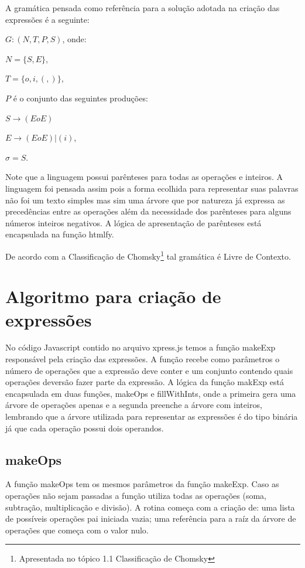 	A gramática pensada como referência para a solução adotada na criação das expressões é a seguinte:
	
$G: (N, T, P, S)$, onde:

$N = \{S,E\}$,

$T = \{o,i,(,)\}$,

$P$ é o conjunto das seguintes produções:

$S \to (EoE)$

$E \to (EoE) | (i)$,

$\sigma = S$.

Note que a linguagem possui parênteses para todas as operações e inteiros. A linguagem foi pensada assim pois a forma ecolhida para representar suas palavras não foi um texto simples mas sim uma árvore que por natureza já expressa as precedências entre as operações além da necessidade dos parênteses para alguns números inteiros negativos. A lógica de apresentação de parênteses está encapsulada na função htmlfy.

	De acordo com a Classificação de Chomsky\footnote{Apresentada no tópico 1.1 Classificação de Chomsky} tal gramática é Livre de Contexto.
	
\section{Algoritmo para criação de expressões}
No código Javascript contido no arquivo xpress.js temos a função makeExp responsável pela criação das expressões. A função recebe como parâmetros o número de operações que a expressão deve conter e um conjunto contendo quais operações deversão fazer parte da expressão. A lógica da função makExp está encapsulada em duas funções, makeOps e fillWithInts, onde a primeira gera uma árvore de operações apenas e a segunda preenche a árvore com inteiros, lembrando que a árvore utilizada para representar as expressões é do tipo binária já que cada operação possui dois operandos.

\subsection{makeOps}
A função makeOps tem os mesmos parâmetros da função makeExp. Caso as operações não sejam passadas a função utiliza todas as operações (soma, subtração, multiplicação e divisão). A rotina começa com a criação de: uma lista de possíveis operações pai iniciada vazia; uma referência para a raíz da árvore de operações que começa com o valor nulo.

